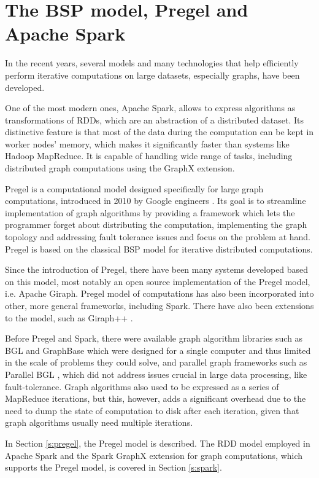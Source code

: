 
\chapter{The BSP model, Pregel and Apache Spark}\label{r:pregel}
In the recent years, several models and many technologies that help efficiently perform iterative computations on large datasets, especially graphs, have been developed.

One of the most modern ones, Apache Spark, allows to express algorithms as transformations of RDDs, which are an abstraction of a distributed dataset. Its distinctive feature is that most of the data during the computation can be kept in worker nodes' memory, which makes it significantly faster than systems like Hadoop MapReduce. It is capable of handling wide range of tasks, including distributed graph computations using the GraphX extension.

Pregel is a computational model designed specifically for large graph computations, introduced in 2010 by Google engineers \cite{pregel}. Its goal is to streamline implementation of graph algorithms by providing a framework which lets the programmer forget about distributing the computation, implementing the graph topology and addressing fault tolerance issues and focus on the problem at hand. Pregel is based on the classical BSP model \cite{bsp} for iterative distributed computations.

Since the introduction of Pregel, there have been many systems developed based on this model, most notably an open source implementation of the Pregel model, i.e. Apache Giraph. Pregel model of computations has also been incorporated into other, more general frameworks, including Spark. There have also been extensions to the model, such as Giraph++ \cite{giraphpp}.

Before Pregel and Spark, there were available graph algorithm libraries such as BGL \cite{bgl} and GraphBase \cite{GraphBase} which were designed for a single computer and thus limited in the scale of problems they could solve, and parallel graph frameworks such as Parallel BGL \cite{parallelbgl}, which did not address issues crucial in large data processing, like fault-tolerance. Graph algorithms also used to be expressed as a series of MapReduce iterations, but this, however, adds a significant overhead due to the need to dump the state of computation to disk after each iteration, given that graph algorithms usually need multiple iterations.

In Section \ref{s:pregel}, the Pregel model is described. The RDD model employed in Apache Spark and the Spark GraphX extension for graph computations, which supports the Pregel model, is covered in Section \ref{s:spark}.

